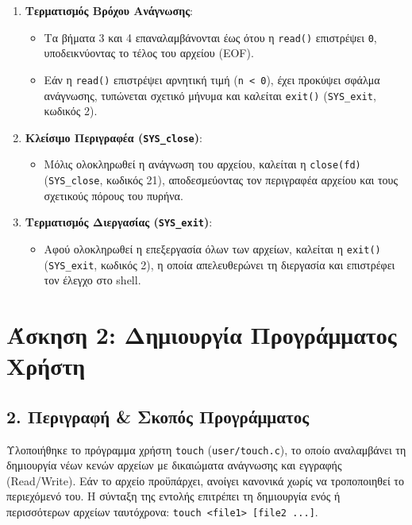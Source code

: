 \documentclass[11pt,a4paper]{article}
\begin{document}
\begin{enumerate}
    \item \textbf{Τερματισμός Βρόχου Ανάγνωσης}:
    \begin{itemize}
        \item Τα βήματα 3 και 4 επαναλαμβάνονται έως ότου η \texttt{read()} επιστρέψει \texttt{0}, 
        υποδεικνύοντας το τέλος του αρχείου (EOF).
        \item Εάν η \texttt{read()} επιστρέψει αρνητική τιμή (\texttt{n < 0}), έχει προκύψει σφάλμα ανάγνωσης, τυπώνεται σχετικό 
        μήνυμα και καλείται \texttt{exit()} (\texttt{SYS\_exit}, κωδικός 2).
    \end{itemize}

    \item \textbf{Κλείσιμο Περιγραφέα (\texttt{SYS\_close})}:
    \begin{itemize}
        \item Μόλις ολοκληρωθεί η ανάγνωση του αρχείου, καλείται η \texttt{close(fd)} (\texttt{SYS\_close}, κωδικός 21), 
        αποδεσμεύοντας τον περιγραφέα αρχείου και τους σχετικούς πόρους του πυρήνα.
    \end{itemize}

    \item \textbf{Τερματισμός Διεργασίας (\texttt{SYS\_exit})}:
    \begin{itemize}
        \item Αφού ολοκληρωθεί η επεξεργασία όλων των αρχείων, καλείται η \texttt{exit()} (\texttt{SYS\_exit}, κωδικός 2), 
        η οποία απελευθερώνει τη διεργασία και επιστρέφει τον έλεγχο στο shell.
    \end{itemize}
\end{enumerate}


\clearpage
\section{Άσκηση 2: Δημιουργία Προγράμματος Χρήστη}

\subsection*{2. Περιγραφή \& Σκοπός Προγράμματος}
Υλοποιήθηκε το πρόγραμμα χρήστη \texttt{touch} (\texttt{user/touch.c}), το οποίο αναλαμβάνει τη δημιουργία νέων κενών αρχείων με δικαιώματα ανάγνωσης και εγγραφής (Read/Write). Εάν το αρχείο προϋπάρχει, ανοίγει κανονικά χωρίς να τροποποιηθεί το περιεχόμενό του. Η σύνταξη της εντολής επιτρέπει τη δημιουργία ενός ή περισσότερων αρχείων ταυτόχρονα: \texttt{touch <file1> [file2 ...]}.
\end{document}
